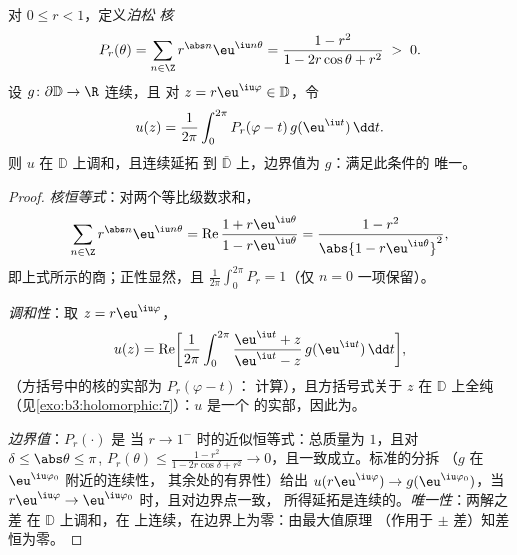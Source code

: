 \begin{theorem}\label{thm:b3:conformal:poisson}
对 $0 \leq r < 1$，定义\emph{泊松
核}
\[
P_r(\theta) = \sum_{n\in\Z}r^{\abs n}\eu^{\iu n\theta}
= \frac{1 - r^2}{1 - 2r\cos\theta + r^2} \;>\; 0 .
\]
设 $g \colon \partial\mathbb D \to \R$ 连续，且
对 $z = r\eu^{\iu\varphi} \in \mathbb D$，令
\[
u(z) = \frac1{2\pi}\int_0^{2\pi}
P_r(\varphi - t)\,g(\eu^{\iu t})\,\dd t .
\]
则 $u$ 在 $\mathbb D$ 上调和，且连续延拓
到 $\bar{\mathbb D}$ 上，边界值为 $g$：满足此条件的
唯一。
\end{theorem}

\begin{proof}
\emph{核恒等式}：对两个等比级数求和，
\[
\sum_{n\in\Z}r^{\abs n}\eu^{\iu n\theta}
= \operatorname{Re}\frac{1 + r\eu^{\iu\theta}}{1 -
r\eu^{\iu\theta}}
= \frac{1 - r^2}{\abs{1 - r\eu^{\iu\theta}}^2},
\]
即上式所示的商；正性显然，且
$\frac1{2\pi}\int_0^{2\pi}P_r = 1$（仅 $n = 0$ 一项保留）。

\emph{调和性}：取 $z = r\eu^{\iu\varphi}$，
\[
u(z) = \operatorname{Re}\biggl[\frac1{2\pi}\int_0^{2\pi}
\frac{\eu^{\iu t} + z}{\eu^{\iu t} - z}\,
g(\eu^{\iu t})\,\dd t\biggr],
\]
（方括号中的核的实部为 $P_r(\varphi - t)$：
计算），且方括号式关于 $z$ 在 $\mathbb D$ 上全纯
（见\cref{exo:b3:holomorphic:7}）：$u$ 是一个
的实部，因此为。

\emph{边界值}：$P_r(\cdot)$ 是
当 $r \to 1^-$ 时的近似恒等式：总质量为 $1$，且对 $\delta \leq
\abs\theta \leq \pi$, $P_r(\theta) \leq \frac{1 - r^2}{1 -
2r\cos\delta + r^2} \to 0$，且一致成立。标准的分拆
（$g$ 在 $\eu^{\iu\varphi_0}$ 附近的连续性，
其余处的有界性）给出 $u(r\eu^{\iu\varphi}) \to
g(\eu^{\iu\varphi_0})$，当 $r\eu^{\iu\varphi} \to
\eu^{\iu\varphi_0}$ 时，且对边界点一致，
所得延拓是连续的。\emph{唯一性}：两解之差
在 $\mathbb D$ 上调和，在
上连续，在边界上为零：由最大值原理
（作用于 $\pm$ 差）知差恒为零。
\end{proof}

